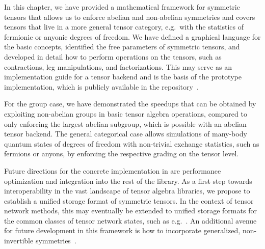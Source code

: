 In this chapter, we have provided a mathematical framework for symmetric tensors that allows us to enforce abelian and non-abelian symmetries and covers tensors that live in a more general tensor category, e.g.~with the statistics of fermionic or anyonic degrees of freedom.
%
We have defined a graphical language for the basic concepts, identified the free parameters of symmetric tensors, and developed in detail how to perform operations on the tensors, such as contractions, leg manipulations, and factorizations.
%
This may serve as an implementation guide for a tensor backend and is the basis of the prototype implementation, which is publicly available in the  repository~\cite{tenpySoftware}.

For the group case, we have demonstrated the speedups that can be obtained by exploiting non-abelian groups in basic tensor algebra operations, compared to only enforcing the largest abelian subgroup, which is possible with an abelian tensor backend.
%
The general categorical case allows simulations of many-body quantum states of degrees of freedom with non-trivial exchange statistics, such as fermions or anyons, by enforcing the respective grading on the tensor level.

Future directions for the concrete implementation in  are performance optimization and integration into the rest of the library.
%
As a first step towards interoperability in the vast landscape of tensor algebra libraries, we propose to establish a unified storage format of symmetric tensors.
%
In the context of tensor network methods, this may eventually be extended to unified storage formats for the common classes of tensor network states, such as e.g.~.
%
An additional avenue for future development in this framework is how to incorporate generalized, non-invertible symmetries~\cite{lootens2023}.

